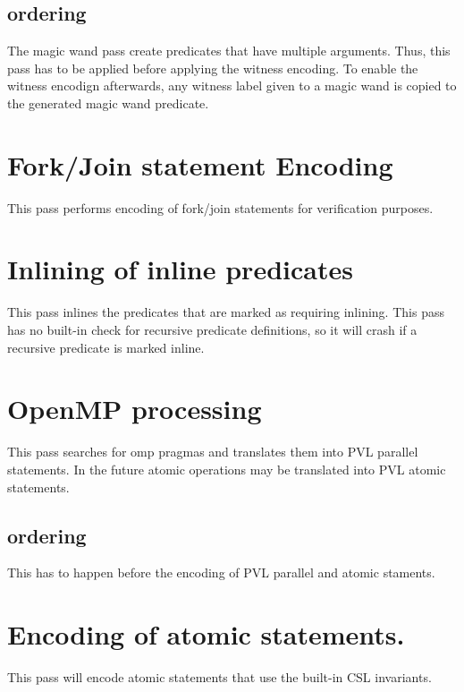 \subsection{ordering}

The magic wand pass create predicates that have multiple arguments.
Thus, this pass has to be applied before applying the witness encoding.
To enable the witness encodign afterwards, any witness label given to a
magic wand is copied to the generated magic wand predicate.

\section{Fork/Join statement Encoding}

This pass performs encoding of fork/join statements for verification
purposes.

\section{Inlining of inline predicates}

This pass inlines the predicates that are marked as requiring inlining.
This pass has no built-in check for recursive predicate definitions,
so it will crash if a recursive predicate is marked inline.

\section{OpenMP processing}

This pass searches for omp pragmas and translates them into
PVL parallel statements. In the future atomic operations
may be translated into PVL atomic statements.


\subsection{ordering}

This has to happen before the encoding of PVL parallel and atomic staments.

\section{Encoding of atomic statements.}

This pass will encode atomic statements that use the built-in CSL invariants.

